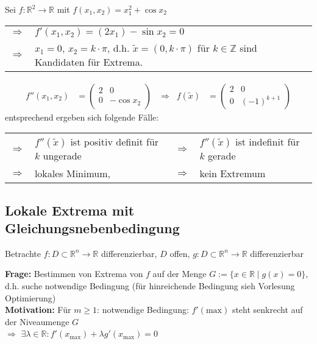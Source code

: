 \begin{example}
	Sei $f:\mathbb{R}^2\to\mathbb{R}$ mit $f(x_1, x_2) = x_1^2 + \cos x_2$ \\
	\begin{tabularx}{\linewidth}{r@{\ \ }X}
	$\Rightarrow$ & $f'(x_1, x_2) = (2x_1) - \sin x_2 = 0$ \\
	$\Rightarrow$  &$x_1 = 0$, $x_2 = k\cdot\pi$, d.h. $\tilde{x} = (0, k\cdot\pi)$ für $k\in\mathbb{Z}$ sind Kandidaten für Extrema.
	\end{tabularx} \begin{align*}
		f''(x_1, x_2) &= \begin{pmatrix}
			2 & 0 \\ 0 & -\cos x_2
		\end{pmatrix} & \Rightarrow\;\; f(\tilde{x}) &= \begin{pmatrix}
			2 & 0 \\ 0 & (-1)^{k+1}
		\end{pmatrix}
	\end{align*}
	entsprechend ergeben sich folgende Fälle:\\
	\begin{tabularx}{\linewidth}{r@{\ \ }Xr@{\ \ }X}
	$\Rightarrow$ & $f''(\tilde{x})$ ist positiv definit für $k$ ungerade & $\Rightarrow$ & $f''(\tilde{x})$ ist indefinit für $k$ gerade \\
	$\Rightarrow$ & lokales Minimum,&
	$\Rightarrow$ & kein Extremum
	\end{tabularx}
\end{example}

\subsection{Lokale Extrema mit Gleichungsnebenbedingung}
Betrachte $f:D\subset\mathbb{R}^n\to\mathbb{R}$ \gls{differenzierbar}, $D$ offen, $g:D\subset\mathbb{R}^n\to\mathbb{R}$ \gls{differenzierbar}

\textbf{Frage:} Bestimmen von Extrema von $f$ auf der Menge $G:= \{ x\in\mathbb{R}\mid g(x) = 0 \}$, d.h. suche notwendige Bedingung (für hinreichende Bedingung sieh Vorlesung Optimierung)\\

\textbf{Motivation:} Für $m\ge 1$: notwendige Bedingung: $f'(\mathrm{max})$ steht senkrecht auf der Niveaumenge $G$  \\
	$\Rightarrow$ $\exists\lambda\in\mathbb{R}: f'(x_{\max}) + \lambda g'(x_{\max}) = 0$

